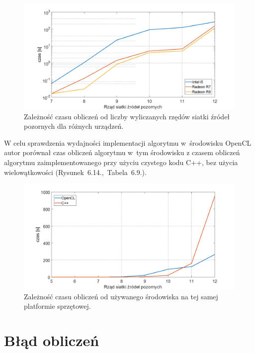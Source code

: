 \begin{figure}[H]
        \centering
                \centering
                \includegraphics[width=16cm]{wykres}
	\caption{Zależność czasu obliczeń od liczby wyliczanych rzędów siatki źródeł pozornych dla różnych urządzeń.}
\end{figure}

W celu sprawdzenia wydajności implementacji algorytmu w~środowisku OpenCL autor porównał czas obliczeń algorytmu w~tym środowisku z czasem obliczeń algorytmu zaimplementowanego przy użyciu czystego kodu C++, bez użycia wielowątkowości (Rysunek~6.14.,~Tabela~6.9.).

\begin{figure}[H]
        \centering
                \centering
                \includegraphics[width=16cm]{wykres2}
	\caption{Zależność czasu obliczeń od używanego środowiska na tej samej platformie sprzętowej.}
\end{figure}



\section{Błąd obliczeń}\label{sec:asdas2sd}

